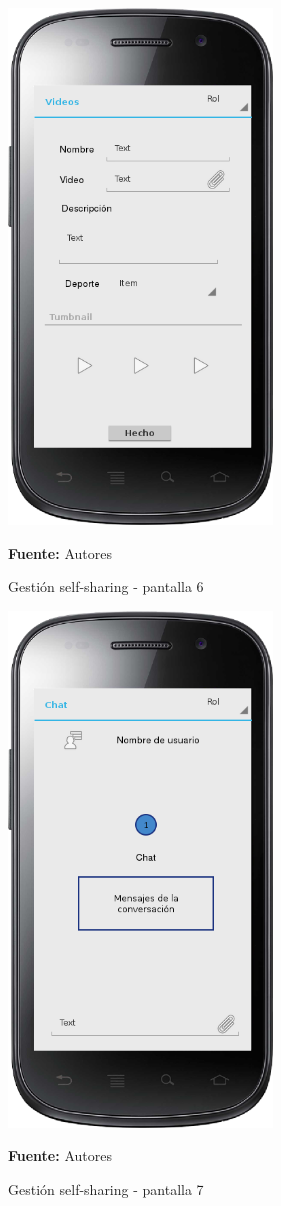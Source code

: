 \begin{figure}[!htb]
  \begin{center}
    \includegraphics[width=7cm]{./imagenes/UI/Self_sharing/self_sharing_6.png}
    \caption{Gestión self-sharing - pantalla 6}
    \label{fig:self_sharing_6}
    \textbf{Fuente:}  Autores
  \end{center}
\end{figure}

\begin{figure}[!htb]
  \begin{center}
    \includegraphics[width=7cm]{./imagenes/UI/Self_sharing/self_sharing_7.png}
    \caption{Gestión self-sharing - pantalla 7}
    \label{fig:self_sharing_7}
    \textbf{Fuente:}  Autores
  \end{center}
\end{figure}

